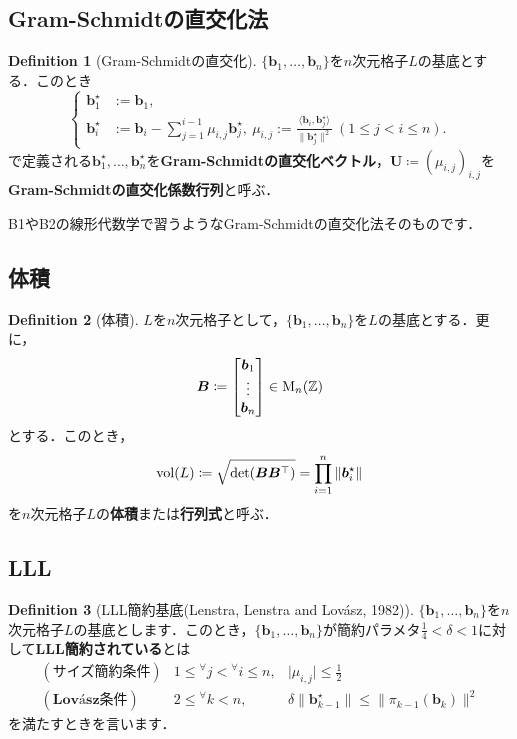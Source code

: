 \documentclass[a4j, dvipdfmx]{jsarticle}
\theoremstyle{definition}
\newtheorem{definition}{Definition}[section]
\begin{document}
\subsection{Gram-Schmidtの直交化法}

\begin{definition}[Gram-Schmidtの直交化]
$\{\boldsymbol{b}_1,\ldots,\boldsymbol{b}_n\}$を$n$次元格子$L$の基底とする．このとき
\[
\left\{\begin{aligned}\boldsymbol{b}_1^\star &:= \boldsymbol{b}_1, \\\boldsymbol{b}_i^\star &:= \boldsymbol{b}_i - \sum_{j=1}^{i-1} \mu_{i, j} \boldsymbol{b}_j^\star,~\mu_{i, j}:=\frac{\langle \boldsymbol{b}_i, \boldsymbol{b}_j^\star\rangle}{\| \boldsymbol{b}_j^\star \|^2}~(1 \leq j < i \leq n).\end{aligned}\right.
\]
で定義される$\boldsymbol{b}_1^\star,\ldots,\boldsymbol{b}_n^\star$を\textbf{Gram-Schmidtの直交化ベクトル}，$\boldsymbol{U}\coloneqq (\mu_{i, j})_{i, j}$を\textbf{Gram-Schmidtの直交化係数行列}と呼ぶ．
\end{definition}

B1やB2の線形代数学で習うようなGram-Schmidtの直交化法そのものです．

\subsection{体積}

\begin{definition}[体積]
$L$を$n$次元格子として，$\{\boldsymbol{b}_1,\ldots,\boldsymbol{b}_n\}$を$L$の基底とする．更に，
\[
\boldsymbol{B}\coloneqq \mqty[\boldsymbol{b}_1\\\vdots\\\boldsymbol{b}_n]\in \mathrm{M}_n(\mathbb{Z})
\]
とする．このとき，
$$
\mathrm{vol}(L)\coloneqq \sqrt{\det(\boldsymbol{BB}^\top)}=\prod_{i=1}^n \norm{\boldsymbol{b}_i^\star}
$$
を$n$次元格子$L$の\textbf{体積}または\textbf{行列式}と呼ぶ．
\end{definition}

\subsection{LLL}

\begin{definition}[LLL簡約基底(Lenstra, Lenstra and Lovász, 1982)]
$\lbrace\boldsymbol{b}_1,\ldots,\boldsymbol{b}_n\rbrace$を$n$次元格子$L$の基底とします．このとき，$\lbrace\boldsymbol{b}_1,\ldots,\boldsymbol{b}_n\rbrace$が簡約パラメタ$\frac{1}{4}<\delta<1$に対して\textbf{LLL簡約されている}とは
$$
\begin{array}{lll}
(\textbf{サイズ簡約条件})&1\le{}^\forall j<{}^\forall i\le n,&\lvert\mu_{i, j}\rvert\le \frac{1}{2}\\
(\textbf{Lovász条件})&2\le{}^\forall k<n, &\delta\lVert \boldsymbol{b}_{k-1}^\star\rVert\le \lVert \pi_{k-1}(\boldsymbol{b}_k)\rVert^2\end{array}$$を満たすときを言います．
\end{definition}
\end{document}
